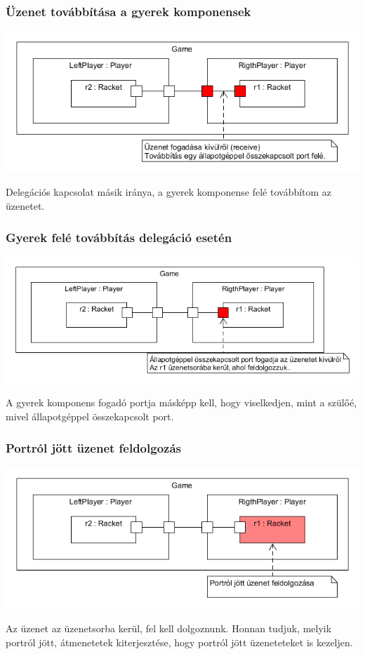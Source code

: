 \documentclass[11pt]{beamer}
\begin{document}
\begin{frame}
	\frametitle{Üzenet továbbítása a gyerek komponensek}
	\begin{center}
	\includegraphics[scale=0.5]{vedes_demo_recived.png}
	\end{center}
	Delegációs kapcsolat másik iránya, a gyerek komponense felé továbbítom az üzenetet.
\end{frame}


\begin{frame}
	\frametitle{Gyerek felé továbbítás delegáció esetén}
	\begin{center}
	\includegraphics[scale=0.5]{vedes_demo_class_recived.png}
	\end{center}
	A gyerek komponens fogadó portja másképp kell, hogy viselkedjen, mint a szülőé, mivel állapotgéppel összekapcsolt port.
\end{frame}

\begin{frame}
	\frametitle{Portról jött üzenet feldolgozás}
	\begin{center}
	\includegraphics[scale=0.5]{vedes_demo_recived_proc.png}
	\end{center}
		Az üzenet az üzenetsorba kerül, fel kell dolgoznunk. Honnan tudjuk, melyik portról jött, átmenetetek kiterjesztése, hogy portról jött üzeneteteket is kezeljen.
\end{frame}
\end{document}

